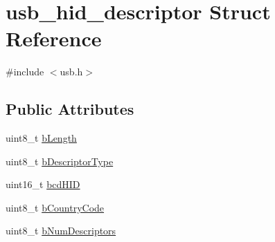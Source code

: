 \hypertarget{structusb__hid__descriptor}{\section{usb\-\_\-hid\-\_\-descriptor Struct Reference}
\label{structusb__hid__descriptor}
}


{\ttfamily \#include $<$usb.\-h$>$}

\subsection*{Public Attributes}
\begin{DoxyCompactItemize}
\item 
uint8\-\_\-t \hyperlink{structusb__hid__descriptor_adedc57a5e5e9873d1cb7d00d69bfe1c7}{b\-Length}
\item 
uint8\-\_\-t \hyperlink{structusb__hid__descriptor_a01533992789ba6c7306e0f97c1c01765}{b\-Descriptor\-Type}
\item 
uint16\-\_\-t \hyperlink{structusb__hid__descriptor_af5ba1299c6b42c862f2f3e478173218d}{bcd\-H\-I\-D}
\item 
uint8\-\_\-t \hyperlink{structusb__hid__descriptor_a143eb3e58466e54c19c1b9ab8a31ac6f}{b\-Country\-Code}
\item 
uint8\-\_\-t \hyperlink{structusb__hid__descriptor_a0f0d0cf9739138f069273f284490e0d8}{b\-Num\-Descriptors}
\end{DoxyCompactItemize}


